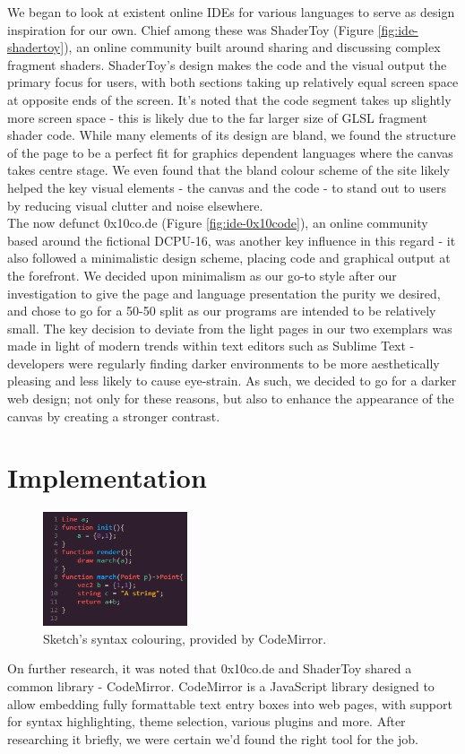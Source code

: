 \documentclass{l3proj}
\begin{document}
We began to look at existent online IDEs for various languages to serve as design inspiration for our own. Chief among these was ShaderToy (Figure \ref{fig:ide-shadertoy}), an online community built around sharing and discussing complex fragment shaders. ShaderToy's design makes the code and the visual output the primary focus for users, with both sections taking up relatively equal screen space at opposite ends of the screen. It's noted that the code segment takes up slightly more screen space - this is likely due to the far larger size of GLSL fragment shader code. While many elements of its design are bland, we found the structure of the page to be a perfect fit for graphics dependent languages where the canvas takes centre stage. We even found that the bland colour scheme of the site likely helped the key visual elements - the canvas and the code - to stand out to users by reducing visual clutter and noise elsewhere.\\

The now defunct 0x10co.de (Figure \ref{fig:ide-0x10code}), an online community based around the fictional DCPU-16, was another key influence in this regard - it also followed a minimalistic design scheme, placing code and graphical output at the forefront. We decided upon minimalism as our go-to style after our investigation to give the page and language presentation the purity we desired, and chose to go for a 50-50 split as our programs are intended to be relatively small. The key decision to deviate from the light pages in our two exemplars was made in light of modern trends within text editors such as Sublime Text - developers were regularly finding darker environments to be more aesthetically pleasing and less likely to cause eye-strain. As such, we decided to go for a darker web design; not only for these reasons, but also to enhance the appearance of the canvas by creating a stronger contrast.

\section{Implementation}
\label{ide-impl}
\begin{figure}
  \centering
  \includegraphics[width=0.38\textwidth]{images/sketch-syntax}
  \caption{Sketch's syntax colouring, provided by CodeMirror.}
  \label{fig:ide-syntax}
\end{figure}
On further research, it was noted that 0x10co.de and ShaderToy shared a common library - CodeMirror. CodeMirror is a JavaScript library designed to allow embedding fully formattable text entry boxes into web pages, with support for syntax highlighting, theme selection, various plugins and more. After researching it briefly, we were certain we'd found the right tool for the job.
\end{document}
